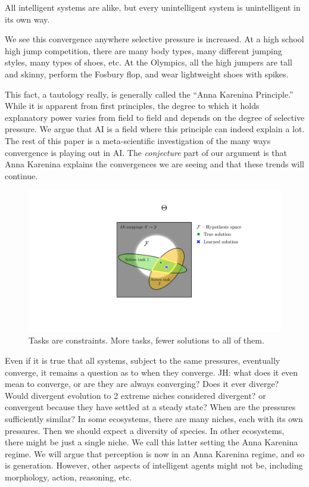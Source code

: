\documentclass{article}
\newcommand{\jh}[1]{{\;\color{red}JH: #1}}
\theoremstyle{plain}
\theoremstyle{definition}
\theoremstyle{remark}
\begin{document}
All intelligent systems are alike, but every unintelligent system is unintelligent in its own way.


We see this convergence anywhere selective pressure is increased. At a high school high jump competition, there are many body types, many different jumping styles, many types of shoes, etc. At the Olympics, all the high jumpers are tall and skinny, perform the Fosbury flop, and wear lightweight shoes with spikes.

This fact, a tautology really, is generally called the ``Anna Karenina Principle.''~\cite{XX} While it is apparent from first principles, the degree to which it holds explanatory power varies from field to field and depends on the degree of selective pressure. We argue that AI is a field where this principle can indeed explain a lot. The rest of this paper is a meta-scientific investigation of the many ways convergence is playing out in AI. The \textit{conjecture} part of our argument is that Anna Karenina explains the convergences we are seeing and that these trends will continue.

\begin{figure}[t]
    \centering
    \includegraphics[width=1.0\linewidth]{figures/tasks_are_constraints.pdf}
    \caption{Tasks are constraints. More tasks, fewer solutions to all of them.}
\end{figure}

Even if it is true that all systems, subject to the same pressures, eventually converge, it remains a question as to when they converge. \jh{what does it even mean to converge, or are they are always converging? Does it ever diverge? Would divergent evolution to 2 extreme niches considered divergent? or convergent because they have settled at a steady state?} When are the pressures sufficiently similar? In some ecosystems, there are many niches, each with its own pressures. Then we should expect a diversity of species. In other ecosystems, there might be just a single niche. We call this latter setting the Anna Karenina regime. We will argue that perception is now in an Anna Karenina regime, and so is generation. However, other aspects of intelligent agents might not be, including morphology, action, reasoning, etc.
\end{document}
